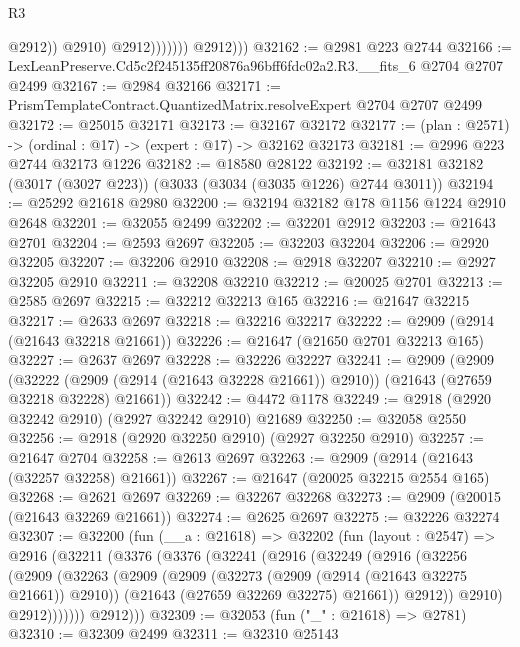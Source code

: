 \begin{lexlean}{R3}
\begin{coremodule}
                              @2912))
                          @2910)
                        @2912)))))))
          @2912)))
@32162 := @2981 @223 @2744
@32166 := LexLeanPreserve.Cd5c2f245135ff20876a96bff6fdc02a2.R3.__fits_6 @2704 @2707 @2499
@32167 := @2984 @32166
@32171 := PrismTemplateContract.QuantizedMatrix.resolveExpert @2704 @2707 @2499
@32172 := @25015 @32171
@32173 := @32167 @32172
@32177 := (plan : @2571) -> (ordinal : @17) -> (expert : @17) -> @32162 @32173
@32181 := @2996 @223 @2744 @32173 @1226
@32182 := @18580 @28122
@32192 := @32181 @32182 (@3017 (@3027 @223)) (@3033 (@3034 (@3035 @1226) @2744 @3011))
@32194 := @25292 @21618 @2980
@32200 := @32194 @32182 @178 @1156 @1224 @2910 @2648
@32201 := @32055 @2499
@32202 := @32201 @2912
@32203 := @21643 @2701
@32204 := @2593 @2697
@32205 := @32203 @32204
@32206 := @2920 @32205
@32207 := @32206 @2910
@32208 := @2918 @32207
@32210 := @2927 @32205 @2910
@32211 := @32208 @32210
@32212 := @20025 @2701
@32213 := @2585 @2697
@32215 := @32212 @32213 @165
@32216 := @21647 @32215
@32217 := @2633 @2697
@32218 := @32216 @32217
@32222 := @2909 (@2914 (@21643 @32218 @21661))
@32226 := @21647 (@21650 @2701 @32213 @165)
@32227 := @2637 @2697
@32228 := @32226 @32227
@32241 := @2909
    (@2909
      (@32222 (@2909 (@2914 (@21643 @32228 @21661)) @2910))
      (@21643 (@27659 @32218 @32228) @21661))
@32242 := @4472 @1178
@32249 := @2918 (@2920 @32242 @2910) (@2927 @32242 @2910) @21689
@32250 := @32058 @2550
@32256 := @2918 (@2920 @32250 @2910) (@2927 @32250 @2910)
@32257 := @21647 @2704
@32258 := @2613 @2697
@32263 := @2909 (@2914 (@21643 (@32257 @32258) @21661))
@32267 := @21647 (@20025 @32215 @2554 @165)
@32268 := @2621 @2697
@32269 := @32267 @32268
@32273 := @2909 (@20015 (@21643 @32269 @21661))
@32274 := @2625 @2697
@32275 := @32226 @32274
@32307 := @32200
    (fun (__a : @21618) =>
    @32202
      (fun (layout : @2547) =>
      @2916
        (@32211
          (@3376
            (@3376
              (@32241
                (@2916
                  (@32249
                    (@2916
                      (@32256
                        (@2909
                          (@32263
                            (@2909
                              (@2909
                                (@32273 (@2909 (@2914 (@21643 @32275 @21661)) @2910))
                                (@21643 (@27659 @32269 @32275) @21661))
                              @2912))
                          @2910)
                        @2912)))))))
          @2912)))
@32309 := @32053 (fun ("_" : @21618) => @2781)
@32310 := @32309 @2499
@32311 := @32310 @25143

\end{coremodule}
\end{lexlean}
